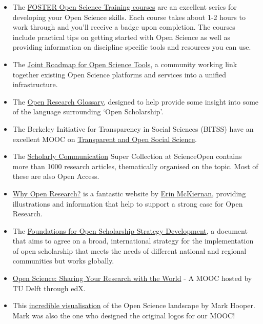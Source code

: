 \documentclass[]{book}
\begin{document}
\begin{itemize}
\item
  The \href{https://www.fosteropenscience.eu/toolkit}{FOSTER Open Science Training courses} are an excellent series for developing your Open Science skills. Each course takes about 1-2 hours to work through and you'll receive a badge upon completion. The courses include practical tips on getting started with Open Science as well as providing information on discipline specific tools and resources you can use.
\item
  The \href{http://jrost.org/}{Joint Roadmap for Open Science Tools}, a community working link together existing Open Science platforms and services into a unified infrastructure.
\item
  The \href{http://www.righttoresearch.org/resources/OpenResearchGlossary/index.shtml}{Open Research Glossary}, designed to help provide some insight into some of the language surrounding `Open Scholarship'.
\item
  The Berkeley Initiative for Transparency in Social Sciences (BITSS) have an excellent MOOC on \href{https://www.bitss.org/events/mooc-transparent-and-open-social-science/}{Transparent and Open Social Science}.
\item
  The \href{https://www.scienceopen.com/search\#collection/69988c7e-1855-4007-ba94-caa4c4638b1f}{Scholarly Communication} Super Collection at ScienceOpen contains more than 1000 research articles, thematically organised on the topic. Most of these are also Open Access.
\item
  \href{http://whyopenresearch.org/}{Why Open Research?} is a fantastic website by \href{https://twitter.com/emckiernan13}{Erin McKiernan}, providing illustrations and information that help to support a strong case for Open Research.
\item
  The \href{https://open-scholarship-strategy.github.io/site/}{Foundations for Open Scholarship Strategy Development}, a document that aims to agree on a broad, international strategy for the implementation of open scholarship that meets the needs of different national and regional communities but works globally.
\item
  \href{https://www.edx.org/course/open-science-sharing-your-research-with-the-world}{Open Science: Sharing Your Research with the World} - A MOOC hosted by TU Delft through edX.
\item
  This \href{http://www.markhooper.io/openscience/\#-1:0100000000}{incredible visualisation} of the Open Science landscape by Mark Hooper. Mark was also the one who designed the original logos for our MOOC!
\end{itemize}
\end{document}
